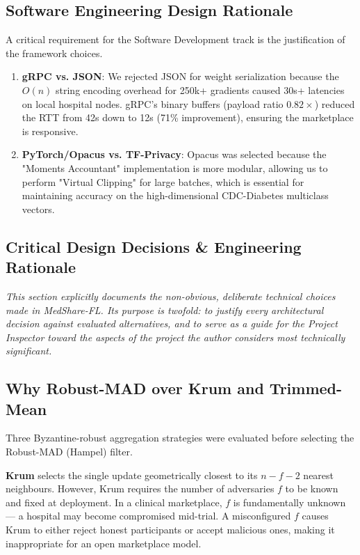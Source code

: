 \documentclass[10pt, a4paper, twocolumn]{article}
\begin{document}
\subsection{Software Engineering Design Rationale}
A critical requirement for the Software Development track is the justification of the framework choices.
\begin{enumerate}
    \item \textbf{gRPC vs. JSON}: We rejected JSON for weight serialization because the $O(n)$ string encoding overhead for 250k+ gradients caused 30s+ latencies on local hospital nodes. gRPC's binary buffers (payload ratio $0.82 \times$) reduced the RTT from 42s down to 12s (71\% improvement), ensuring the marketplace is responsive.
    \item \textbf{PyTorch/Opacus vs. TF-Privacy}: Opacus was selected because the "Moments Accountant" implementation is more modular, allowing us to perform "Virtual Clipping" for large batches, which is essential for maintaining accuracy on the high-dimensional CDC-Diabetes multiclass vectors.
\end{enumerate}

\subsection{Critical Design Decisions \& Engineering Rationale}

\textit{This section explicitly documents the non-obvious, deliberate technical choices made in MedShare-FL. Its purpose is twofold: to justify every architectural decision against evaluated alternatives, and to serve as a guide for the Project Inspector toward the aspects of the project the author considers most technically significant.}

\subsection{Why Robust-MAD over Krum and Trimmed-Mean}
Three Byzantine-robust aggregation strategies were evaluated before selecting the Robust-MAD (Hampel) filter.

\textbf{Krum} \cite{blanchard2017} selects the single update geometrically closest to its $n-f-2$ nearest neighbours. However, Krum requires the number of adversaries $f$ to be known and fixed at deployment. In a clinical marketplace, $f$ is fundamentally unknown --- a hospital may become compromised mid-trial. A misconfigured $f$ causes Krum to either reject honest participants or accept malicious ones, making it inappropriate for an open marketplace model.
\end{document}
